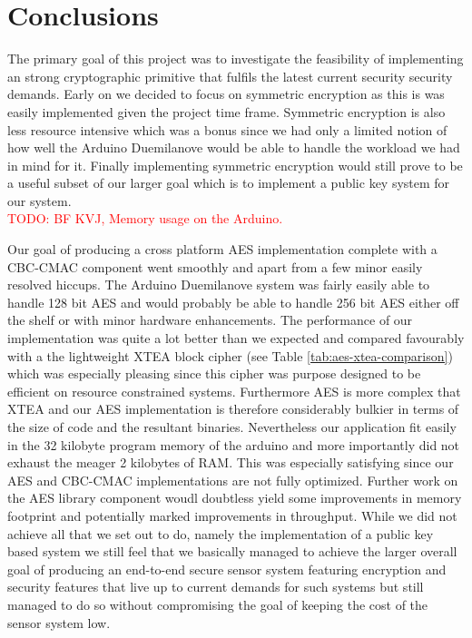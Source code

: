 \section{Conclusions}

The primary goal of this project was to investigate the feasibility of implementing an strong cryptographic primitive that fulfils the latest current security security demands. Early on we decided to focus on symmetric encryption as this is was easily implemented given the project time frame. Symmetric encryption is also less resource intensive which was a bonus since we had only a limited notion of how well the Arduino Duemilanove would be able to handle the workload we had in mind for it. Finally implementing symmetric encryption would still prove to be a useful subset of our larger goal which is to implement a public key system for our system.\\

\textcolor{red}{TODO: BF KVJ, Memory usage on the Arduino.} 

Our goal of producing a cross platform AES implementation complete with a CBC-CMAC component went smoothly and apart from a few minor easily resolved hiccups. The Arduino Duemilanove system was fairly easily able to handle 128 bit AES and would probably be able to handle 256 bit AES either off the shelf or with minor hardware enhancements. The performance of our implementation was quite a lot better than we expected and compared favourably with a the lightweight XTEA block cipher (see Table \ref{tab:aes-xtea-comparison}) which was especially pleasing since this cipher was purpose designed to be efficient on resource constrained systems. Furthermore AES is more complex that XTEA and our AES implementation is therefore considerably bulkier in terms of the size of code and the resultant binaries. Nevertheless our application fit easily in the 32 kilobyte program memory of the arduino and more importantly did not exhaust the meager 2 kilobytes of RAM. This was especially satisfying since our AES and CBC-CMAC implementations are not fully optimized. Further work on the AES library component woudl doubtless yield some improvements in memory footprint and potentially marked improvements in throughput. While we did not achieve all that we set out to do, namely the implementation of a public key based system we still feel that we basically managed to achieve the larger overall goal of producing an end-to-end secure sensor system featuring encryption and security features that live up to current demands for such systems but still managed to do so without compromising the goal of keeping the cost of the sensor system low.\\

